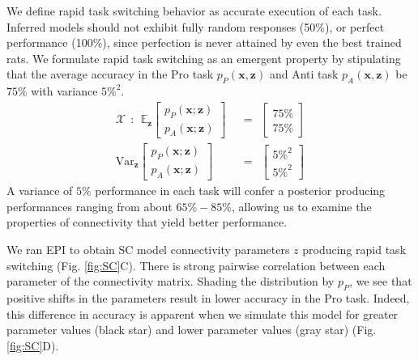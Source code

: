 \documentclass[11pt]{article}
\begin{document}
We define rapid task switching behavior as accurate execution of each task.  Inferred models should not exhibit fully random responses (50\%), or perfect performance (100\%), since perfection is never attained by even the best trained rats.
We formulate rapid task switching as an emergent property by stipulating that the average accuracy in the Pro task $p_P(\mathbf{x}, \mathbf{z})$ and Anti task $p_A(\mathbf{x}, \mathbf{z})$ be $75\%$ with variance $5\%^2$.
\begin{equation}\label{eq:EP}
\begin{split}
\mathcal{X} ~~:~~ \mathbb{E}_{\mathbf{z}}\begin{bmatrix} p_P(\mathbf{x}; \mathbf{z}) \\ p_A(\mathbf{x}; \mathbf{z}) \end{bmatrix}  &~~=~~  \begin{bmatrix} 75\% \\ 75\% \end{bmatrix}  \\ 
 \text{Var}_{\mathbf{z}}\begin{bmatrix} p_P(\mathbf{x}; \mathbf{z}) \\ p_A(\mathbf{x}; \mathbf{z}) \end{bmatrix}  &~~=~~  \begin{bmatrix} 5\%^2 \\ 5\%^2  \end{bmatrix}
\end{split}
\end{equation}
A variance of $5\%$ performance in each task will confer a posterior producing performances ranging from about $65\%-85\%$, allowing us to examine the properties of connectivity that yield better performance.

We ran EPI to obtain SC model connectivity parameters $z$ producing rapid task switching (Fig. \ref{fig:SC}C).
There is strong pairwise correlation between each parameter of the connectivity matrix.
Shading the distribution by $p_P$, we see that positive shifts in the parameters result in lower accuracy in the Pro task.
Indeed, this difference in accuracy is apparent when we simulate this model for greater parameter values (black star) and lower parameter values (gray star) (Fig. \ref{fig:SC}D). 
\end{document}
